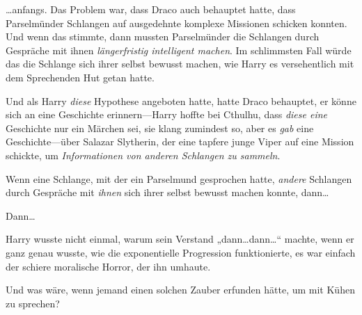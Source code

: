 …anfangs. Das Problem war, dass Draco auch behauptet hatte, dass Parselmünder Schlangen auf ausgedehnte komplexe Missionen schicken konnten. Und wenn das stimmte, dann mussten Parselmünder die Schlangen durch Gespräche mit ihnen \emph{längerfristig intelligent machen}. Im schlimmsten Fall würde das die Schlange sich ihrer selbst bewusst machen, wie Harry es versehentlich mit dem Sprechenden Hut getan hatte.

Und als Harry \emph{diese} Hypothese angeboten hatte, hatte Draco behauptet, er könne sich an eine Geschichte erinnern—Harry hoffte bei Cthulhu, dass \emph{diese eine} Geschichte nur ein Märchen sei, sie klang zumindest so, aber es \emph{gab} eine Geschichte—über Salazar Slytherin, der eine tapfere junge Viper auf eine Mission schickte, um \emph{Informationen von anderen Schlangen zu sammeln}.

Wenn eine Schlange, mit der ein Parselmund gesprochen hatte, \emph{andere} Schlangen durch Gespräche mit \emph{ihnen} sich ihrer selbst bewusst machen konnte, dann…

Dann…

Harry wusste nicht einmal, warum sein Verstand „dann…dann…“ machte, wenn er ganz genau wusste, wie die exponentielle Progression funktionierte, es war einfach der schiere moralische Horror, der ihn umhaute.

Und was wäre, wenn jemand einen solchen Zauber erfunden hätte, um mit Kühen zu sprechen?

